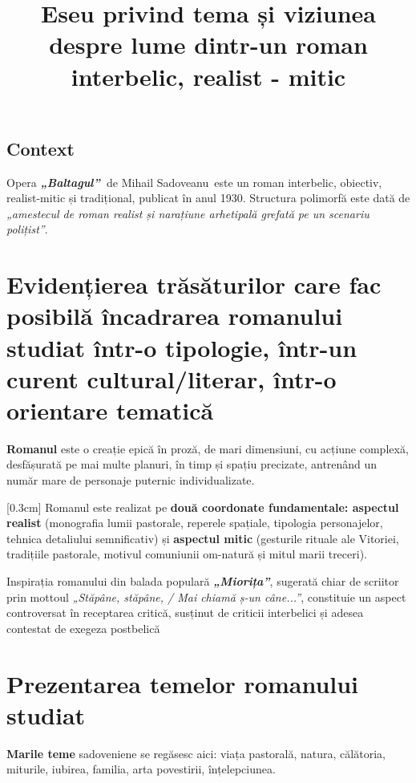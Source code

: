 \documentclass[
12pt,
a4paper
]{article}
\title{Eseu privind tema și viziunea despre lume dintr-un roman interbelic, realist - mitic}
\date{}   %
\author{} %
\newcommand{\operatitle}{\textbf{\textit{„Baltagul”\ }}} %
\newcommand{\operaauthor}{Mihail Sadoveanu\ } %
\begin{document}
\maketitle %



\subsection{Context}

Opera \operatitle de \operaauthor este un roman interbelic, obiectiv, realist-mitic și tradițional, publicat în anul 1930. Structura polimorfă este dată de \textit{„amestecul de roman realist și narațiune arhetipală grefată pe un scenariu polițist”}.

\section{Evidențierea trăsăturilor care fac posibilă încadrarea romanului studiat într-o tipologie, într-un curent cultural/literar, într-o orientare tematică}

\textbf{Romanul} este o creație epică în proză, de mari dimensiuni, cu acțiune complexă, desfășurată pe mai multe planuri, în timp și spațiu precizate, antrenând un număr mare de personaje puternic individualizate.

[0.3cm]
Romanul este realizat pe \textbf{două coordonate fundamentale: aspectul realist} (monografia lumii pastorale, reperele spațiale, tipologia personajelor, tehnica detaliului semnificativ) și \textbf{aspectul mitic} (gesturile rituale ale Vitoriei, tradițiile pastorale, motivul comuniunii om-natură și mitul marii treceri).

Inspirația romanului din balada populară \textbf{\textit{„Miorița”}}, sugerată chiar de scriitor prin mottoul \textit{„Stăpâne, stăpâne, / Mai chiamă ș-un câne...”}, constituie un aspect controversat în receptarea critică, susținut de criticii interbelici și adesea contestat de exegeza postbelică

\section{Prezentarea temelor romanului studiat}

\textbf{Marile teme} sadoveniene se regăsesc aici: viața pastorală, natura, călătoria, miturile, iubirea, familia, arta povestirii, înțelepciunea.
\end{document}
